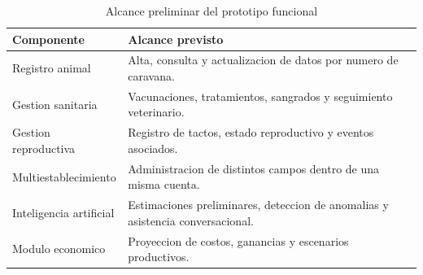 \begin{table}[H]
	\caption{Alcance preliminar del prototipo funcional}
	\label{tab:scope}
	\centering
	\begin{tabular}{|p{}|p{}|}
		\hline
		\textbf{Componente} & \textbf{Alcance previsto} \\
		\hline
		Registro animal & Alta, consulta y actualizacion de datos por numero de caravana. \\
		\hline
		Gestion sanitaria & Vacunaciones, tratamientos, sangrados y seguimiento veterinario. \\
		\hline
		Gestion reproductiva & Registro de tactos, estado reproductivo y eventos asociados. \\
		\hline
		Multiestablecimiento & Administracion de distintos campos dentro de una misma cuenta. \\
		\hline
		Inteligencia artificial & Estimaciones preliminares, deteccion de anomalias y asistencia conversacional. \\
		\hline
		Modulo economico & Proyeccion de costos, ganancias y escenarios productivos. \\
		\hline
	\end{tabular}
\end{table}
